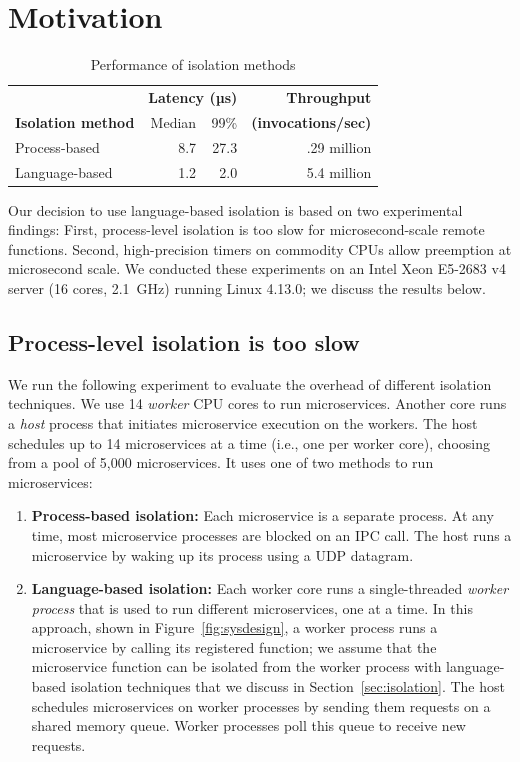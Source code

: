 \section{Motivation}
\label{sec:motive}

\begin{table}
\begin{center}
\small
\begin{tabular}{lrrr}
   & \multicolumn{2}{c}{\textbf{Latency (µs)}} & \textbf{Throughput} \\
  \textbf{Isolation method} & Median & 99\% & \textbf{(invocations/sec)} \\
\midrule
Process-based & 8.7 & 27.3 & .29 million \\
Language-based & 1.2 & 2.0 & 5.4 million \\
\end{tabular}
\caption{Performance of isolation methods}
\label{tab:isolation_methods}
\end{center}
\end{table}

Our decision to use language-based isolation is based on two experimental
findings:  First, process-level isolation is too slow for
microsecond-scale remote functions. Second, high-precision timers on commodity
CPUs allow preemption at microsecond scale.  We conducted these experiments
on an Intel Xeon E5-2683 v4 server (16 cores, 2.1~GHz) running
Linux 4.13.0; we discuss the results below.

\subsection{Process-level isolation is too slow}
We run the following experiment to evaluate the overhead of different isolation
techniques. We use 14 \emph{worker} CPU cores to run microservices. Another core 
runs a \emph{host} process that initiates microservice execution on the workers.
The host schedules up to 14 microservices at a time (i.e., one
per worker core), choosing from a pool of 5,000 microservices. It uses one of two
methods to run microservices:

\begin{enumerate}
\item \textbf{Process-based isolation:} Each microservice is a separate process.
At any time, most microservice processes are blocked on an IPC
call. The host runs a microservice by waking up its process using a UDP datagram.
\item \textbf{Language-based isolation:} Each worker core runs a single-threaded
\emph{worker process} that is used to run different microservices, one at a time.
In this approach, shown in Figure~\ref{fig:sysdesign}, a worker process runs a
microservice by calling its registered
function; we assume that the microservice function can be isolated from the
worker process with language-based isolation techniques that we discuss in
Section~\ref{sec:isolation}. The host schedules microservices on worker processes by
sending them
requests on a shared memory queue. Worker processes poll this queue to receive
new requests.
\end{enumerate}

